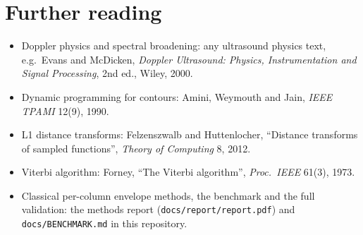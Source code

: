 \documentclass[11pt,a4paper]{article}
\newcommand{\code}[1]{\texttt{\small #1}}
\begin{document}
\section{Further reading}
\begin{itemize}
\item Doppler physics and spectral broadening: any ultrasound physics text, e.g.\ Evans and McDicken,
\emph{Doppler Ultrasound: Physics, Instrumentation and Signal Processing}, 2nd ed., Wiley, 2000.
\item Dynamic programming for contours: Amini, Weymouth and Jain, \emph{IEEE TPAMI} 12(9), 1990.
\item L1 distance transforms: Felzenszwalb and Huttenlocher, ``Distance transforms of sampled functions'',
\emph{Theory of Computing} 8, 2012.
\item Viterbi algorithm: Forney, ``The Viterbi algorithm'', \emph{Proc.\ IEEE} 61(3), 1973.
\item Classical per-column envelope methods, the benchmark and the full validation: the methods report
(\code{docs/report/report.pdf}) and \code{docs/BENCHMARK.md} in this repository.
\end{itemize}
\end{document}
